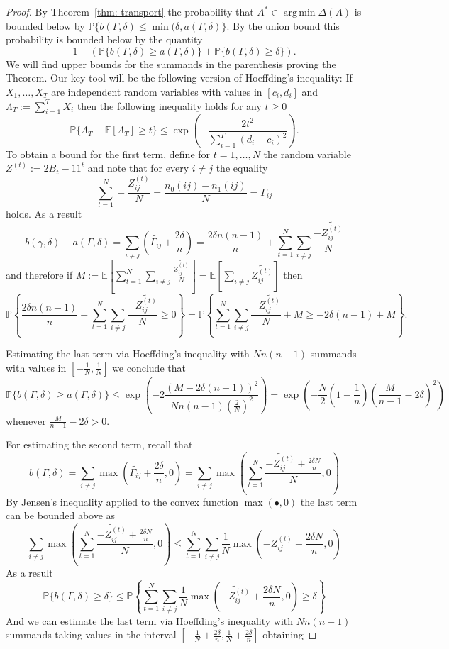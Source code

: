 \documentclass[12pt]{amsart}
\theoremstyle{remark}
\DeclareMathOperator*{\argmin}{arg\,min}
\newcommand{\PP}{\mathbb{P}}
\newcommand{\EE}{\mathbb{E}}
\begin{document}
\begin{proof} By Theorem~\ref{thm: transport} the probability that $A^*\in \argmin \Delta(A)
$ is bounded below by $\PP\{b(\Gamma,\delta)\leq \min(\delta,a(\Gamma,\delta)\}$. By the union bound this probability is bounded below by the quantity
\[1-\left(\PP\{b(\Gamma,\delta)\geq a(\Gamma,\delta)\}+ \PP\{b(\Gamma,\delta)\geq \delta\}\right).\]
We will find upper bounds for the summands in the parenthesis proving the Theorem. Our key tool will be the following version of Hoeffding's inequality: If $X_1,\dots, X_T$ are independent random variables with values in $[c_i,d_i]$ and $\Lambda_T:=\sum_{i=1}^T X_i$ then the following inequality holds for any $t\geq 0$ 
\[\PP\{\Lambda_T-\EE[\Lambda_T]\geq t\}\leq \exp\left(-\frac{2t^2}{\sum_{i=1}^T (d_i-c_i)^2}\right).\]
To obtain a bound for the first term, define for $t=1,\dots, N$ the random variable $Z^{(t)}:=2B_t-11^t$ and note that for every $i\neq j$ the equality
\[\sum_{t=1}^N-\frac{Z_{ij}^{(t)}}{N} = \frac{n_0(ij)-n_1(ij)}{N}=\Gamma_{ij}\]
holds. As a result
\[b(\gamma,\delta)-a(\Gamma,\delta) = \sum_{i\neq j} \left(\widetilde{\Gamma_{ij}}+\frac{2\delta}{n}\right)= \frac{2\delta n(n-1)}{n} + \sum_{t=1}^N \sum_{i\neq j} \frac{-\widetilde{Z^{(t)}_{ij}}}{N}\]
and therefore if $M:=\EE\left[\sum_{t=1}^N \sum_{i\neq j} \frac{\widetilde{Z^{(t)}_{ij}}}{N}\right]=\EE\left[\sum_{i\neq j} \widetilde{Z^{(t)}_{ij}}\right]$ then 
\[\PP\left\{\frac{2\delta n(n-1)}{n} + \sum_{t=1}^N \sum_{i\neq j} \frac{-\widetilde{Z^{(t)}_{ij}}}{N}\geq 0\right\} = \PP\left\{\sum_{t=1}^N \sum_{i\neq j} \frac{-\widetilde{Z^{(t)}_{ij}}}{N} + M \geq -2\delta (n-1) + M \right\}.\]

Estimating the last term via Hoeffding's inequality with $Nn(n-1)$ summands with values in $\left[-\frac{1}{N},\frac{1}{N}\right]$ we conclude that 
\[\PP\{b(\Gamma,\delta)\geq a(\Gamma,\delta)\}\leq \exp\left(-2\frac{(M-2\delta(n-1))^2}{Nn(n-1)(\frac{2}{N})^2}\right)=\exp\left( -\frac{N}{2}\left(1-\frac{1}{n}\right) \left(\frac{M}{n-1}-2\delta\right)^2\right) \]
whenever $\frac{M}{n-1}-2\delta>0$.

For estimating the second term, recall that
\[b(\Gamma,\delta)= \sum_{i\neq j} \max\left(\widetilde{\Gamma_{ij}}+\frac{2\delta}{n},0\right) = \sum_{i\neq j} \max\left(\sum_{t=1}^N\frac{\widetilde{-Z_{ij}^{(t)}}+\frac{2\delta N}{n}}{N},0\right)\]
By Jensen's inequality applied to the convex function $\max(\bullet,0)$ the last term can be bounded above as
\[
\sum_{i\neq j} \max\left(\sum_{t=1}^N\frac{\widetilde{-Z_{ij}^{(t)}}+\frac{2\delta N}{n}}{N},0\right)\leq \sum_{t=1}^N \sum_{i\neq j}  \frac{1}{N} \max\left(\widetilde{-Z_{ij}^{(t)}}+\frac{2\delta N}{n},0\right)
\]
As a result
\[\PP\{b(\Gamma,\delta)\geq \delta\}\leq \PP\left\{ \sum_{t=1}^N \sum_{i\neq j}  \frac{1}{N} \max\left(\widetilde{-Z_{ij}^{(t)}}+\frac{2\delta N}{n},0\right)\geq \delta\right\}\]
And we can estimate the last term via Hoeffding's inequality with $Nn(n-1)$ summands taking values in the interval $\left[-\frac{1}{N}+\frac{2\delta}{n},\frac{1}{N}+\frac{2\delta}{n}\right]$ obtaining


\end{proof}
\end{document}
